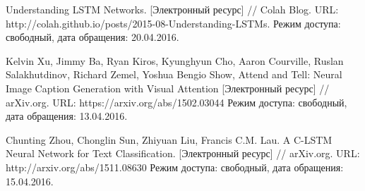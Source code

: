 \begin{thebibliography}{00}
    Understanding LSTM Networks. [Электронный ресурс] // Colah Blog.
    URL: http://colah.github.io/posts/2015-08-Understanding-LSTMs.
    Режим доступа: свободный, дата обращения: 20.04.2016.

    Kelvin Xu, Jimmy Ba, Ryan Kiros, Kyunghyun Cho, Aaron Courville, Ruslan Salakhutdinov, Richard Zemel, Yoshua Bengio
    Show, Attend and Tell: Neural Image Caption Generation with Visual Attention [Электронный ресурс] // arXiv.org.
    URL: https://arxiv.org/abs/1502.03044
    Режим доступа: свободный, дата обращения: 13.04.2016.

    Chunting Zhou, Chonglin Sun, Zhiyuan Liu, Francis C.M. Lau.
    A C-LSTM Neural Network for Text Classification. [Электронный ресурс] // arXiv.org.
    URL: http://arxiv.org/abs/1511.08630
    Режим доступа: свободный, дата обращения: 15.04.2016.

\end{thebibliography}
\endgroup

\clearpage
